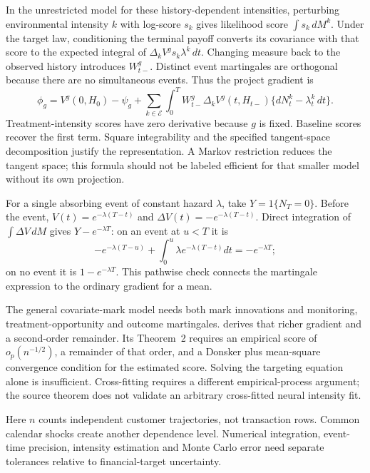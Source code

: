 In the unrestricted model for these history-dependent intensities,
perturbing environmental intensity $k$ with log-score $s_k$ gives likelihood
score $\int s_k\,dM^k$. Under the target law, conditioning the terminal
payoff converts its covariance with that score to the expected integral
of $\Delta_kV^g s_k\lambda^k\,dt$. Changing measure back to the observed
history introduces $W^g_{t-}$. Distinct event martingales are orthogonal
because there are no simultaneous events. Thus the project gradient is
\begin{equation}
 \phi_g=V^g(0,H_0)-\psi_g+
 \sum_{k\in\mathcal E}\int_0^T W^g_{t-}\Delta_kV^g(t,H_{t-})
       \{dN^k_t-\lambda^k_t\,dt\}.
 \label{r3:jump-gradient}
\end{equation}
Treatment-intensity scores have zero derivative because $g$ is fixed.
Baseline scores recover the first term. Square integrability and the
specified tangent-space decomposition justify the representation.
A Markov restriction reduces the tangent space; this formula should not
be labeled efficient for that smaller model without its own projection.

For a single absorbing event of constant hazard $\lambda$, take
$Y=1\{N_T=0\}$. Before the event,
$V(t)=e^{-\lambda(T-t)}$ and $\Delta V(t)=-e^{-\lambda(T-t)}$.
Direct integration of $\int\Delta V\,dM$ gives $Y-e^{-\lambda T}$:
on an event at $u<T$ it is
\[
 -e^{-\lambda(T-u)}
 +\int_0^u\lambda e^{-\lambda(T-t)}dt=-e^{-\lambda T};
\]
on no event it is $1-e^{-\lambda T}$.
This pathwise check connects the martingale expression to the ordinary
gradient for a mean.

The general covariate-mark model needs both mark innovations and
monitoring, treatment-opportunity and outcome martingales.
\citet[Theorem 1 and equations (9)--(13)]{rytgaard2021} derives that
richer gradient and a second-order remainder. Its Theorem~2 requires
an empirical score of $o_p(n^{-1/2})$, a remainder of that order, and
a Donsker plus mean-square convergence condition for the estimated score.
Solving the targeting equation alone is insufficient. Cross-fitting
requires a different empirical-process argument; the source theorem does
not validate an arbitrary cross-fitted neural intensity fit.

Here $n$ counts independent customer trajectories, not transaction rows.
Common calendar shocks create another dependence level. Numerical
integration, event-time precision, intensity estimation and Monte Carlo
error need separate tolerances relative to financial-target uncertainty.


